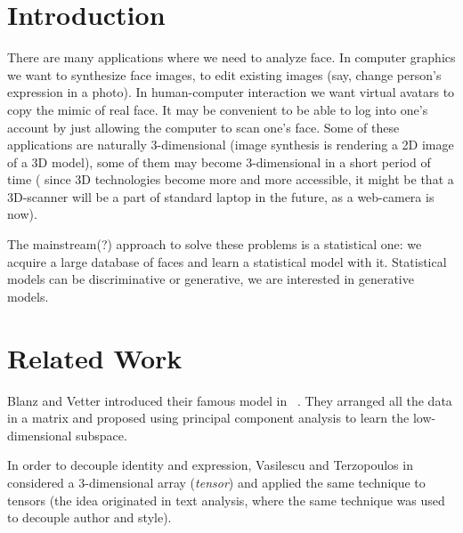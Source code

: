 \chapter{Introduction}

There are many applications where we need to analyze face.
In computer graphics we want to synthesize face images, 
to edit existing images (say, change person's expression in a photo).
In human-computer interaction we want virtual avatars to copy the mimic
of real face. It may be convenient to be able to log into one's account
by just allowing the computer to scan one's face.
Some of these applications are naturally 3-dimensional (image synthesis
is rendering a 2D image of a 3D model),
some of them may become 3-dimensional in a short period of time (
since 3D technologies become more and more accessible,
it might be that a 3D-scanner will be a part of standard laptop
in the future, as a web-camera is now). 


The mainstream(?) approach to solve these problems 
is a statistical one: we acquire a large database of faces
and learn a statistical model with it.
Statistical models can be discriminative or generative,
we are interested in generative models.



\chapter{Related Work}


Blanz and Vetter introduced their famous model in ~\cite{bl_vet_2003}.
They arranged all the data in a matrix and proposed using principal
component analysis to learn the low-dimensional subspace.

In order to decouple identity and expression, 
Vasilescu and Terzopoulos in~\cite{vt_2002} considered a 3-dimensional
array (\textit{tensor}) and applied the same technique
to tensors (the idea originated in text analysis,
where the same technique was used to decouple author 
and style).


